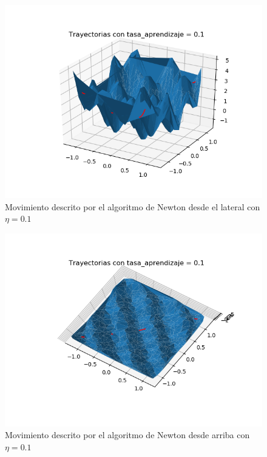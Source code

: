 \documentclass[12pt,a4paper]{article}
\begin{document}
\begin{figure}[H]
	\centering
	\includegraphics[scale=0.8]{./Imagenes/bonus14.png}
	\caption{Movimiento descrito por el algoritmo de Newton desde el lateral con $\eta=0.1$}
\end{figure}

\begin{figure}[H]
	\centering
	\includegraphics[scale=0.8]{./Imagenes/bonus15.png}
	\caption{Movimiento descrito por el algoritmo de Newton desde arriba con $\eta=0.1$}
\end{figure}
\end{document}
